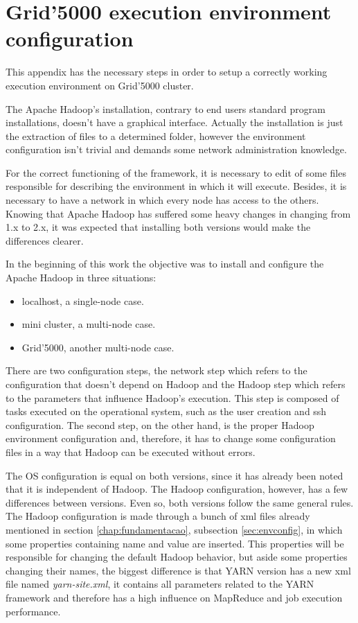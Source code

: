 \chapter{Grid'5000 execution environment configuration}

This appendix has the necessary steps in order to setup a correctly working execution environment on Grid'5000 cluster.

The Apache Hadoop's installation, contrary to end users standard program installations, doesn't have a graphical interface. Actually the installation is just the extraction of files to a determined folder, however the environment configuration isn't trivial and demands some network administration knowledge.

For the correct functioning of the framework, it is necessary to edit of some files responsible for describing the environment in which it will execute. Besides, it is necessary to have a network in which every node has access to the others. Knowing that Apache Hadoop has suffered some heavy changes in changing from 1.x to 2.x, it was expected that installing both versions would make the differences clearer.

In the beginning of this work the objective was to install and configure the Apache Hadoop in three situations:
\begin{itemize}
        \item localhost, a single-node case.
        \item mini cluster, a multi-node case.
        \item Grid'5000, another multi-node case.
\end{itemize}

There are two configuration steps, the network step which refers to the configuration that doesn't depend on Hadoop and the Hadoop step which refers to the parameters that influence Hadoop's execution. This step is composed of tasks executed on the operational system, such as the user creation and ssh configuration. The second step, on the other hand, is the proper Hadoop environment configuration and, therefore, it has to change some configuration files in a way that Hadoop can be executed without errors.

The OS configuration is equal on both versions, since it has already been noted that it is independent of Hadoop. The Hadoop configuration, however, has a few differences between versions. Even so, both versions follow the same general rules. The Hadoop configuration is made through a bunch of xml files already mentioned in section \ref{chap:fundamentacao}, subsection \ref{sec:envconfig}, in which some properties containing name and value are inserted. This properties will be responsible for changing the default Hadoop behavior, but aside some properties changing their names, the biggest difference is that YARN version has a new xml file named \textit{yarn-site.xml}, it contains all parameters related to the YARN framework and therefore has a high influence on MapReduce and job execution performance.

